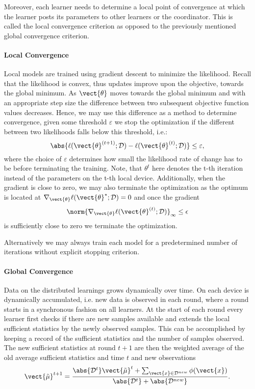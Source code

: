 Moreover, each learner needs to determine a local point of convergence at which the learner posts its parameters to other learners or the coordinator. 
This is called the local convergence criterion as opposed to the previously mentioned global convergence criterion.

\paragraph*{Local Convergence}
Local models are trained using gradient descent to minimize the likelihood. 
Recall that the likelihood is convex, thus updates improve upon the objective, towards the global minimum.
As $\vect{\theta}$ moves towards the global minimum and with an appropriate step size the difference between two subsequent objective function values decreases.
Hence, we may use this difference as a method to determine convergence, given some threshold $\varepsilon$ we stop the optimization if the different between two likelihoods falls below this threshold, i.e.:
\begin{equation}
    \abs{\ell(\vect{\theta}^{(t+1)} ; \mathcal{D}) - \ell(\vect{\theta}^{(t)} ; \mathcal{D})} \leq \varepsilon,
\end{equation}
where the choice of $\varepsilon$ determines how small the likelihood rate of change has to be before terminating the training.
Note, that $\theta^t$ here denotes the t-th iteration instead of the parameters on the t-th local device.
Additionally, when the gradient is close to zero, we may also terminate the optimization as the optimum is located at $\nabla_{\vect{\theta}} \ell(\vect{\theta}^{*} ; \mathcal{D}) = 0$ and once the gradient
\begin{equation}
    \norm{\nabla_{\vect{\theta}} \ell(\vect{\theta}^{(t)} ; \mathcal{D})}_{\infty} \leq \epsilon
\end{equation}
is sufficiently close to zero we terminate the optimization. 

Alternatively we may always train each model for a predetermined number of iterations without explicit stopping criterion.

\paragraph*{Global Convergence}

Data on the distributed learnings grows dynamically over time.
On each device is dynamically accumulated, i.e. new data is observed in each round, where a round starts in a synchronous fashion on all learners.
At the start of each round every learner first checks if there are new samples available and extends the local sufficient statistics by the newly observed samples.
This can be accomplished by keeping a record of the sufficient statistics and the number of samples observed.
The new sufficient statistics at round $t+1$ are then the weighted average of the old average sufficient statistics and time $t$ and new observations 
\begin{equation}
    \vect{\tilde{\mu}}^{t+1} = \frac{\abs{\mathcal{D}^{t}}\vect{\tilde{\mu}}^t + \sum_{\vect{x} \in \mathcal{D}^{new}} \phi(\vect{x})}{\abs{\mathcal{D}^{t}} + \abs{\mathcal{D}^{new}}}.
\end{equation}

